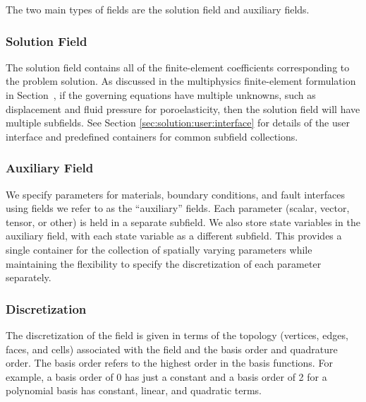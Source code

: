 The two main types of fields are the solution field and auxiliary
fields.

\subsubsection{Solution Field}

The solution field contains all of the finite-element coefficients
corresponding to the problem solution. As discussed in the
multiphysics finite-element formulation in
Section~\label{sec:multiphysics:formulation}, if the governing
equations have multiple unknowns, such as displacement and fluid
pressure for poroelasticity, then the solution field will have
multiple subfields.  See Section \vref{sec:solution:user:interface} for
details of the user interface and predefined containers for common
subfield collections.

\subsubsection{Auxiliary Field}

We specify parameters for materials, boundary conditions, and fault
interfaces using fields we refer to as the ``auxiliary'' fields.  Each
parameter (scalar, vector, tensor, or other) is held in a separate
subfield. We also store state variables in the auxiliary field, with
each state variable as a different subfield. This provides a single
container for the collection of spatially varying parameters while
maintaining the flexibility to specify the discretization of each
parameter separately. 

\subsubsection{Discretization}

The discretization of the field is given in terms of the topology
(vertices, edges, faces, and cells) associated with the field and the
basis order and quadrature order. The basis order refers to the
highest order in the basis functions. For example, a basis order of 0
has just a constant and a basis order of 2 for a polynomial basis has
constant, linear, and quadratic terms.



